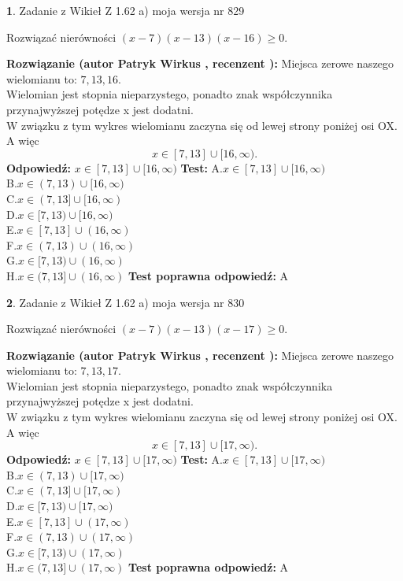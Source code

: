\documentclass[12pt, a4paper]{article}
\theoremstyle{definition} %
\newtheorem{zad}{}
\newcommand{\zadStart}[1]{\begin{zad}#1\newline}
\newcommand{\zadStop}{\end{zad}}
\newcommand{\rozwStart}[2]{\noindent \textbf{Rozwiązanie (autor #1 , recenzent #2): }\newline}
\newcommand{\rozwStop}{\newline}
\newcommand{\odpStart}{\noindent \textbf{Odpowiedź:}\newline}
\newcommand{\odpStop}{\newline}
\newcommand{\testStart}{\noindent \textbf{Test:}\newline}
\newcommand{\testStop}{\newline}
\newcommand{\kluczStart}{\noindent \textbf{Test poprawna odpowiedź:}\newline}
\newcommand{\kluczStop}{\newline}
\begin{document}
\zadStart{Zadanie z Wikieł Z 1.62 a) moja wersja nr 829}

Rozwiązać nierówności $(x-7)(x-13)(x-16)\ge0$.
\zadStop
\rozwStart{Patryk Wirkus}{}
Miejsca zerowe naszego wielomianu to: $7, 13, 16$.\\
Wielomian jest stopnia nieparzystego, ponadto znak współczynnika przy\linebreak najwyższej potędze x jest dodatni.\\ W związku z tym wykres wielomianu zaczyna się od lewej strony poniżej osi OX. A więc $$x \in [7,13] \cup [16,\infty).$$
\rozwStop
\odpStart
$x \in [7,13] \cup [16,\infty)$
\odpStop
\testStart
A.$x \in [7,13] \cup [16,\infty)$\\
B.$x \in (7,13) \cup [16,\infty)$\\
C.$x \in (7,13] \cup [16,\infty)$\\
D.$x \in [7,13) \cup [16,\infty)$\\
E.$x \in [7,13] \cup (16,\infty)$\\
F.$x \in (7,13) \cup (16,\infty)$\\
G.$x \in [7,13) \cup (16,\infty)$\\
H.$x \in (7,13] \cup (16,\infty)$
\testStop
\kluczStart
A
\kluczStop



\zadStart{Zadanie z Wikieł Z 1.62 a) moja wersja nr 830}

Rozwiązać nierówności $(x-7)(x-13)(x-17)\ge0$.
\zadStop
\rozwStart{Patryk Wirkus}{}
Miejsca zerowe naszego wielomianu to: $7, 13, 17$.\\
Wielomian jest stopnia nieparzystego, ponadto znak współczynnika przy\linebreak najwyższej potędze x jest dodatni.\\ W związku z tym wykres wielomianu zaczyna się od lewej strony poniżej osi OX. A więc $$x \in [7,13] \cup [17,\infty).$$
\rozwStop
\odpStart
$x \in [7,13] \cup [17,\infty)$
\odpStop
\testStart
A.$x \in [7,13] \cup [17,\infty)$\\
B.$x \in (7,13) \cup [17,\infty)$\\
C.$x \in (7,13] \cup [17,\infty)$\\
D.$x \in [7,13) \cup [17,\infty)$\\
E.$x \in [7,13] \cup (17,\infty)$\\
F.$x \in (7,13) \cup (17,\infty)$\\
G.$x \in [7,13) \cup (17,\infty)$\\
H.$x \in (7,13] \cup (17,\infty)$
\testStop
\kluczStart
A
\kluczStop
\end{document}
